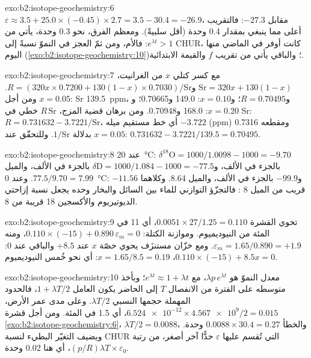 \begin{solution}{exo:b2:isotope-geochemistry:6}
$\varepsilon \approx 3.5 + 25.0\times(-0.45)\times2.7 = 3.5 - 30.4 = -26.9$، مقابل
$-27.3$: فالتقريب أعلى مما ينبغي بمقدار 0.4 وحدة (أقل سلبيةً). ومعظم
الفرق، نحو 0.3 وحدة، يأتي من $e^{\lambda t} > 1$: فالأم، ومن ثمّ
العجز في النموّ نسبةً إلى CHUR، كانت أوفر في الماضي منها اليوم
(\cref{exo:b2:isotope-geochemistry:10})؛ والباقي يأتي من تقريب $f$ والقيمة الابتدائية.
\end{solution}

\begin{solution}{exo:b2:isotope-geochemistry:7}
مع كسر كتلي $x$ من الغرانيت، $\mathrm{Sr} = 320x + 130(1-x)$
و$R = (320x\times0.7200 + 130(1-x)\times0.7030)/\mathrm{Sr}$. ومن أجل $x = 0.05$: Sr
\qty{139.5}{ppm}، و$R = 0.70495$؛ و$x = 0.10$: 149.0 و0.70665؛ و$x = 0.20$: 168.0
و0.70948. ومن برهان قضية المزج، $R\,\mathrm{Sr}$ خطي في Sr:
$R = 0.731632 - 3.7221/\mathrm{Sr}$، أي خط مستقيم ميله $-3.722$ (ppm)
ومقطعه 0.7316 بدلالة $1/\mathrm{Sr}$. وللتحقّق عند $x = 0.05$: $0.731632 - 3.7221/139.5
= 0.70495$.
\end{solution}

\begin{solution}{exo:b2:isotope-geochemistry:8}
عند \qty{20}{\degreeCelsius}: $\delta^{18}\mathrm{O} = 1000/1.0098 - 1000 = -9.70$ بالجزء
في الألف، و$\delta\mathrm{D} = 1000/1.084 - 1000 = -77.5$ بالجزء في الألف، والميل $77.5/9.70 = 7.99$.
وعند \qty{0}{\degreeCelsius}: $-11.56$ و$-99.9$ بالجزء في الألف، والميل 8.64. وكلاهما قريب من
الميل 8 : فالتجزّؤ التوازني للماء
بين السائل والبخار وحده يجعل نسبة إزاحتي الديوتيريوم والأكسجين 18
قريبة من 8.
\end{solution}

\begin{solution}{exo:b2:isotope-geochemistry:9}
تحوي القشرة $0.0051\times27/1.25 = 0.110$، أي 11 في المئة من النيوديميوم. وموازنة
الكتلة: $0.110\times(-15) + 0.890\,\varepsilon_m = 0$، ومنه $\varepsilon_m = 1.65/0.890 =
+1.9$. ومع خزّان مستنزَف يحوي حصّة $x$ عند $+8.5$ والباقي عند 0:
$0.110\times(-15) + 8.5x = 0$، $x = 1.65/8.5 = 0.19$: أي نحو خُمس
النيوديميوم.
\end{solution}

\begin{solution}{exo:b2:isotope-geochemistry:10}
معدل النموّ هو $\lambda p\,e^{\lambda t}$، مع $e^{\lambda t} \approx 1 + \lambda t$؛
وبأخذ متوسطه على الفترة من الانفصال $T$ إلى الحاضر يكون العامل
$1 + \lambda T/2$، فالحدود المهملة حجمها النسبي $\lambda T/2$. وعلى مدى
عمر الأرض، $\num{6.524e-12}\times\num{4.567e9}/2 = 0.015$، أي 1.5 في المئة. ومن أجل
قشرة \cref{exo:b2:isotope-geochemistry:6}، $\lambda T/2 = 0.0088$، والخطأ $0.0088\times30.4 = 0.27$
وحدة. ويضيف التغيّر البطيء لنسبة CHUR التي تُقسم عليها $\varepsilon$
حدًّا آخر أصغر، من رتبة $(p/R)\lambda T \times \varepsilon_0$، أي هنا 0.02 وحدة.
\end{solution}


